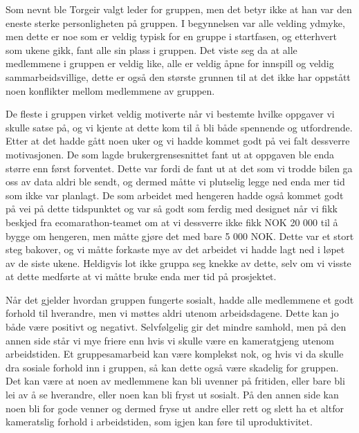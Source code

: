 Som nevnt ble Torgeir valgt leder for gruppen, men det betyr ikke at han var den eneste sterke personligheten på gruppen. I begynnelsen var alle velding ydmyke, men dette er noe som er veldig typisk for en gruppe i startfasen, og etterhvert som ukene gikk, fant alle sin plass i gruppen. Det viste seg da at alle medlemmene i gruppen er veldig like, alle er veldig åpne for innspill og veldig sammarbeidsvillige, dette er også den største grunnen til at det ikke har oppstått noen konflikter mellom medlemmene av gruppen.

De fleste i gruppen virket veldig motiverte når vi bestemte hvilke oppgaver vi skulle satse på, og vi kjente at dette kom til å bli både spennende og utfordrende. Etter at det hadde gått noen uker og vi hadde kommet godt på vei falt dessverre motivasjonen.
De som lagde brukergrensesnittet fant ut at oppgaven ble enda større enn først forventet. Dette var fordi de fant ut at det som vi trodde bilen ga oss av data aldri ble sendt, og dermed måtte vi plutselig legge ned enda mer tid som ikke var planlagt. 
De som arbeidet med hengeren hadde også kommet godt på vei på dette tidspunktet og var så godt som ferdig med designet når vi fikk beskjed fra ecomarathon-teamet om at vi dessverre ikke fikk NOK 20 000 til å bygge om hengeren, men måtte gjøre det med bare 5 000 NOK. Dette var et stort steg bakover, og vi måtte forkaste mye av det arbeidet vi hadde lagt ned i løpet av de siste ukene. 
Heldigvis lot ikke gruppa seg knekke av dette, selv om vi visste at dette medførte at vi måtte bruke enda mer tid på prosjektet.

Når det gjelder hvordan gruppen fungerte sosialt, hadde alle medlemmene et godt forhold til hverandre, men vi møttes aldri utenom arbeidsdagene. Dette kan jo både være positivt og negativt. 
Selvfølgelig gir det mindre samhold, men på den annen side står vi mye friere enn hvis vi skulle være en kameratgjeng utenom arbeidstiden. 
Et gruppesamarbeid kan være komplekst nok, og hvis vi da skulle dra sosiale forhold inn i gruppen, så kan dette også være skadelig for gruppen. 
Det kan være at noen av medlemmene kan bli uvenner på fritiden, eller bare bli lei av å se hverandre, eller noen kan bli fryst ut sosialt. 
På den annen side kan noen bli for gode venner og dermed fryse ut andre eller rett og slett ha et altfor kameratslig forhold i arbeidstiden, som igjen kan føre til uproduktivitet.
